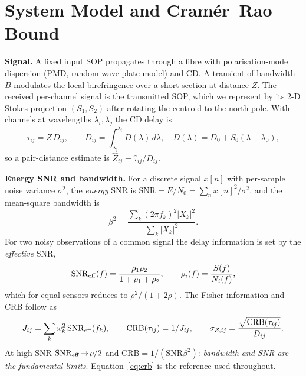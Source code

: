 \documentclass[10pt]{article}
\newcommand{\SNR}{\mathrm{SNR}}
\newcommand{\SNReff}{\mathrm{SNR}_{\rm eff}}
\newcommand{\CRB}{\mathrm{CRB}}
\begin{document}
\section{System Model and Cram\'er--Rao Bound}
\label{sec:model}
\textbf{Signal.} A fixed input SOP propagates through a fibre with
polarisation-mode dispersion (PMD, random wave-plate model) and CD. A transient
of bandwidth $B$ modulates the local birefringence over a short section at
distance $Z$. The received per-channel signal is the transmitted SOP, which we
represent by its 2-D Stokes projection $(S_1,S_2)$ after rotating the centroid
to the north pole. With channels at wavelengths $\lambda_i,\lambda_j$ the CD
delay is
\begin{equation}
\tau_{ij} = Z\,D_{ij},\qquad
D_{ij}=\int_{\lambda_j}^{\lambda_i}\! D(\lambda)\,d\lambda,\quad
D(\lambda)=D_0+S_0(\lambda-\lambda_0),
\label{eq:cd}
\end{equation}
so a pair-distance estimate is $\hat{Z}_{ij}=\hat{\tau}_{ij}/D_{ij}$.

\smallskip
\noindent\textbf{Energy SNR and bandwidth.} For a discrete signal $x[n]$ with
per-sample noise variance $\sigma^2$, the \emph{energy} SNR is
$\SNR=E/N_0=\sum_n x[n]^2/\sigma^2$, and the mean-square bandwidth is
\begin{equation}
\beta^2=\frac{\sum_k (2\pi f_k)^2|X_k|^2}{\sum_k |X_k|^2}.
\label{eq:beta}
\end{equation}
For two noisy observations of a common signal the delay information is set by
the \emph{effective} SNR,
\begin{equation}
\SNReff(f)=\frac{\rho_1\rho_2}{1+\rho_1+\rho_2},\qquad
\rho_i(f)=\frac{S(f)}{N_i(f)},
\label{eq:effsnr}
\end{equation}
which for equal sensors reduces to $\rho^2/(1+2\rho)$. The Fisher information
and CRB follow as
\begin{equation}
J_{ij}=\sum_k \omega_k^2\,\SNReff(f_k),\qquad
\CRB(\tau_{ij})=1/J_{ij},\qquad
\sigma_{Z,ij}=\frac{\sqrt{\CRB(\tau_{ij})}}{D_{ij}} .
\label{eq:crb}
\end{equation}
At high SNR $\SNReff\!\to\!\rho/2$ and $\CRB=1/(\SNR\beta^2)$: \emph{bandwidth
and SNR are the fundamental limits}. Equation~\eqref{eq:crb} is the reference
used throughout.
\end{document}
